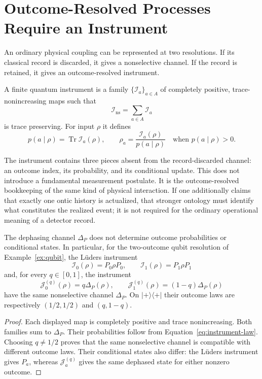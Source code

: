 \documentclass[11pt]{article}
\newcommand{\Inst}{\mathcal I}
\newcommand{\Tr}{\operatorname{Tr}}
\begin{document}
\section{Outcome-Resolved Processes Require an Instrument}

An ordinary physical coupling can be represented at two resolutions.  If its
classical record is discarded, it gives a nonselective channel.  If the record
is retained, it gives an outcome-resolved instrument.

\begin{definition}\label{def:instrument}
A finite quantum instrument is a family
$\{\Inst_a\}_{a\in A}$ of completely positive, trace-nonincreasing maps such
that
\[
 \Inst_{\mathrm{ns}}=\sum_{a\in A}\Inst_a
\]
is trace preserving.  For input $\rho$ it defines
\begin{equation}
 p(a\mid\rho)=\Tr\Inst_a(\rho),
 \qquad
 \rho_a=\frac{\Inst_a(\rho)}{p(a\mid\rho)}
 \quad\text{when }p(a\mid\rho)>0.
 \label{eq:instrument-law}
\end{equation}
\end{definition}

The instrument contains three pieces absent from the record-discarded channel:
an outcome index, its probability, and its conditional update.  This does not
introduce a fundamental measurement postulate.  It is the outcome-resolved
bookkeeping of the same kind of physical interaction.  If one additionally
claims that exactly one ontic history is actualized, that stronger ontology
must identify what constitutes the realized event; it is not required for the
ordinary operational meaning of a detector record.

\begin{theorem}\label{thm:underdetermination}
The dephasing channel $\Delta_P$ does not determine outcome probabilities or
conditional states.  In particular, for the two-outcome qubit resolution of
Example~\ref{ex:qubit}, the L\"uders instrument
\[
 \Inst_0(\rho)=P_0\rho P_0,\qquad
 \Inst_1(\rho)=P_1\rho P_1
\]
and, for every $q\in[0,1]$, the instrument
\[
 \mathcal J^{(q)}_0(\rho)=q\Delta_P(\rho),\qquad
 \mathcal J^{(q)}_1(\rho)=(1-q)\Delta_P(\rho)
\]
have the same nonselective channel $\Delta_P$.  On
$\lvert+\rangle\langle+\rvert$ their outcome laws are respectively
$(1/2,1/2)$ and $(q,1-q)$.
\end{theorem}

\begin{proof}
Each displayed map is completely positive and trace nonincreasing.  Both
families sum to $\Delta_P$.  Their probabilities follow from
Equation~\eqref{eq:instrument-law}.  Choosing $q\neq1/2$ proves that the same
nonselective channel is compatible with different outcome laws.  Their
conditional states also differ: the L\"uders instrument gives $P_a$, whereas
$\mathcal J^{(q)}_a$ gives the same dephased state for either nonzero outcome.
\end{proof}
\end{document}
